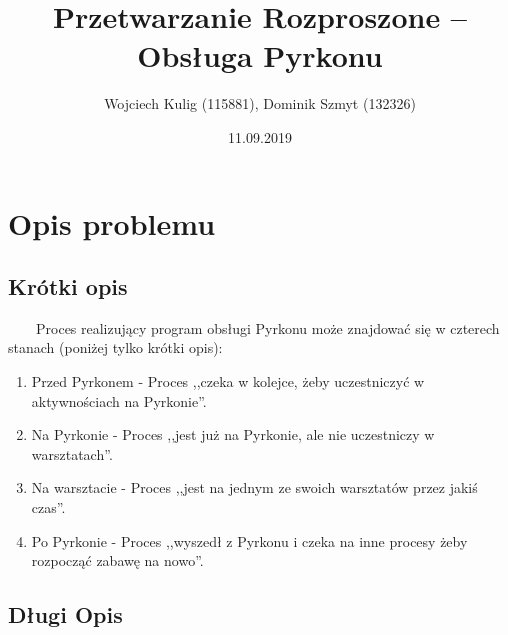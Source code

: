 \documentclass[11pt]{article}
\title{Przetwarzanie Rozproszone -- Obsługa Pyrkonu}
\author{Wojciech Kulig (115881), Dominik Szmyt (132326)}
\date{11.09.2019}
\begin{document}
\maketitle

\section{Opis problemu}

\subsection{Krótki opis}
~~~~Proces realizujący program obsługi Pyrkonu może znajdować się w czterech stanach (poniżej tylko krótki opis):
\begin{enumerate}
\item Przed Pyrkonem - Proces ,,czeka w kolejce, żeby uczestniczyć w aktywnościach na Pyrkonie''.
\item Na Pyrkonie - Proces ,,jest już na Pyrkonie, ale nie uczestniczy w warsztatach''.
\item Na warsztacie - Proces ,,jest na jednym ze swoich warsztatów przez jakiś czas''.
\item Po Pyrkonie - Proces ,,wyszedł z Pyrkonu i czeka na inne procesy żeby rozpocząć zabawę na nowo''.
\end{enumerate}

\subsection{Długi Opis} 
\end{document}
